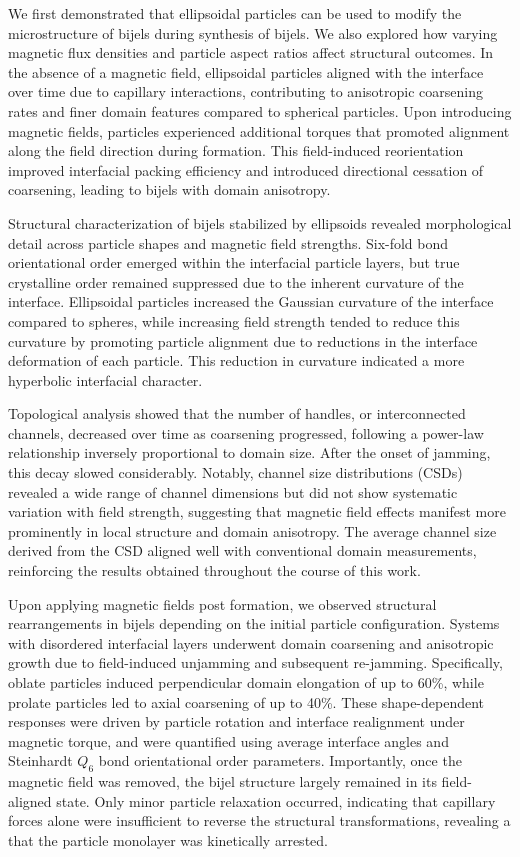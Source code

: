 We first demonstrated that ellipsoidal particles can be used to modify the microstructure of bijels during synthesis of bijels.
We also explored how varying magnetic flux densities and particle aspect ratios affect structural outcomes. 
In the absence of a magnetic field, ellipsoidal particles aligned with the interface over time due to capillary interactions, contributing to 
anisotropic coarsening rates and finer domain features compared to spherical particles. Upon introducing magnetic fields, particles experienced 
additional torques that promoted alignment along the field direction during formation. This field-induced reorientation improved interfacial 
packing efficiency and introduced directional cessation of coarsening, leading to bijels with domain anisotropy.

Structural characterization of bijels stabilized by ellipsoids revealed morphological detail across particle shapes and magnetic field strengths. 
Six-fold bond orientational order emerged within the interfacial particle layers, but true crystalline order remained suppressed due to the 
inherent curvature of the interface. Ellipsoidal particles increased the Gaussian curvature of the interface compared 
to spheres, while increasing field strength tended to reduce this curvature by promoting particle alignment due to reductions in the interface
deformation of each particle. This reduction in curvature indicated a more hyperbolic interfacial character.

Topological analysis showed that the number of handles, or interconnected channels, decreased over time as coarsening progressed, following 
a power-law relationship inversely proportional to domain size. After the onset of jamming, this decay slowed considerably. Notably, 
channel size distributions (CSDs) revealed a wide range of channel dimensions but did not show systematic variation with 
field strength, suggesting that magnetic field effects manifest more prominently in local structure and domain anisotropy. The 
average channel size derived from the CSD aligned well with conventional domain measurements, reinforcing the results obtained throughout
the course of this work.

Upon applying magnetic fields post formation, we observed structural rearrangements in bijels depending on the initial particle 
configuration. Systems with disordered interfacial layers underwent domain coarsening and anisotropic growth due to field-induced unjamming 
and subsequent re-jamming. Specifically, oblate particles induced perpendicular domain elongation of up to 60\%, while prolate particles led 
to axial coarsening of up to 40\%. These shape-dependent responses were driven by particle rotation and interface realignment under magnetic 
torque, and were quantified using average interface angles and Steinhardt $Q_6$ bond orientational order parameters. Importantly, once the 
magnetic field was removed, the bijel structure largely remained in its field-aligned state. Only minor particle relaxation occurred, 
indicating that capillary forces alone were insufficient to reverse the structural transformations, revealing a that the particle monolayer
was kinetically arrested.

